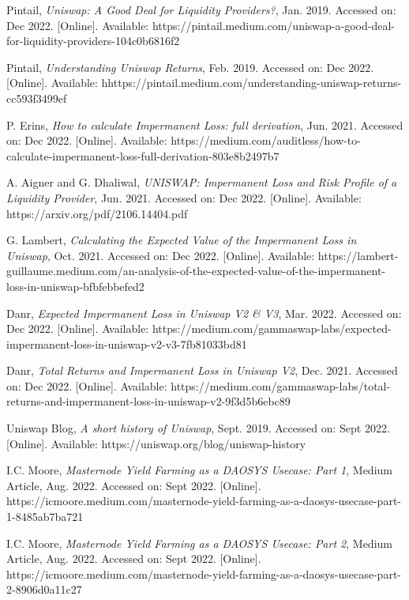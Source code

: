 \documentclass[journal,twocolumn,12pt]{ieeesyscoin}
\begin{document}
\begin{thebibliography}{00}

 Pintail, \textit{Uniswap: A Good Deal for Liquidity Providers?}, Jan. 2019. Accessed on: Dec 2022.  [Online]. Available:  https://pintail.medium.com/uniswap-a-good-deal-for-liquidity-providers-104c0b6816f2

 Pintail, \textit{Understanding Uniswap Returns}, Feb. 2019. Accessed on: Dec 2022.  [Online]. Available:  hhttps://pintail.medium.com/understanding-uniswap-returns-cc593f3499ef

 P. Erins, \textit{How to calculate Impermanent Loss: full derivation}, Jun. 2021. Accessed on: Dec 2022.  [Online]. Available:  https://medium.com/auditless/how-to-calculate-impermanent-loss-full-derivation-803e8b2497b7

 A. Aigner and G. Dhaliwal, \textit{UNISWAP: Impermanent Loss and Risk Profile of a Liquidity Provider}, Jun. 2021. Accessed on: Dec 2022.  [Online]. Available:  https://arxiv.org/pdf/2106.14404.pdf

 G. Lambert, \textit{Calculating the Expected Value of the Impermanent Loss in Uniswap}, Oct. 2021. Accessed on: Dec 2022.  [Online]. Available:  https://lambert-guillaume.medium.com/an-analysis-of-the-expected-value-of-the-impermanent-loss-in-uniswap-bfbfebbefed2

 Danr, \textit{Expected Impermanent Loss in Uniswap V2 \& V3}, Mar. 2022. Accessed on: Dec 2022.  [Online]. Available:  https://medium.com/gammaswap-labs/expected-impermanent-loss-in-uniswap-v2-v3-7fb81033bd81

 Danr, \textit{Total Returns and Impermanent Loss in Uniswap V2}, Dec. 2021. Accessed on: Dec 2022.  [Online]. Available:  https://medium.com/gammaswap-labs/total-returns-and-impermanent-loss-in-uniswap-v2-9f3d5b6ebc89


 Uniswap Blog, \textit{A short history of Uniswap}, Sept. 2019. Accessed on: Sept 2022.  [Online]. Available:  https://uniswap.org/blog/uniswap-history

 I.C. Moore,  \textit{Masternode Yield Farming as a DAOSYS Usecase: Part 1}, Medium Article, Aug. 2022. Accessed on: Sept 2022.  [Online]. https://icmoore.medium.com/masternode-yield-farming-as-a-daosys-usecase-part-1-8485ab7ba721

 I.C. Moore,  \textit{Masternode Yield Farming as a DAOSYS Usecase: Part 2}, Medium Article, Aug. 2022. Accessed on: Sept 2022.  [Online]. https://icmoore.medium.com/masternode-yield-farming-as-a-daosys-usecase-part-2-8906d0a11c27


\end{thebibliography}
\end{document}
